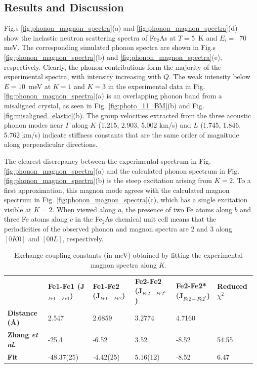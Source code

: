 \documentclass[10pt,doublespacing,edeposit]{uiucthesis2020}
\begin{document}
\begin{mainmatter}
\section{Results and Discussion}



Fig.s \ref{fig:phonon_magnon_spectra}(a) and \ref{fig:phonon_magnon_spectra}(d) show the inelastic neutron scattering spectra of Fe$_2$As at $T = 5$~K and $E_i =$~70 meV. The corresponding simulated phonon spectra are shown in Fig.s \ref{fig:phonon_magnon_spectra}(b) and \ref{fig:phonon_magnon_spectra}(e), respectively. Clearly, the phonon contributions form the majority of the experimental spectra, with intensity increasing with $Q$. 
The weak intensity below $E = 10$~meV  at $K = 1$ and $K = 3$ in the experimental data in Fig. \ref{fig:phonon_magnon_spectra}(a) is an overlapping phonon band from a misaligned crystal, as seen in Fig. \ref{fig:photo_11_BM}(b) and Fig. \ref{fig:misaligned_elastic}(b). The group velocities extracted from the three acoustic phonon modes near $\Gamma$ along $K$ (1.215, 2.903, 5.002 km/s) and $L$ (1.745, 1.846, 5.762 km/s) indicate stiffness constants that are the same order of magnitude along  perpendicular directions.




The clearest discrepancy between the experimental spectrum in Fig. \ref{fig:phonon_magnon_spectra}(a) and the calculated phonon spectrum in Fig. \ref{fig:phonon_magnon_spectra}(b) is the steep excitation arising from $K = 2$. To a first approximation, this magnon mode agrees with the calculated magnon spectrum in Fig. \ref{fig:phonon_magnon_spectra}(c), which has a single excitation visible at $K = 2$. When viewed along $a$, the presence of two Fe atoms along $b$ and three Fe atoms along $c$ in the Fe$_2$As chemical unit cell means that the periodicities of the observed phonon and magnon spectra are 2 and 3 along $[0K0]$ and $[00L]$, respectively.

\begin{table}
\caption{\label{tab:Jvalues} 
Exchange coupling constants (in meV) obtained by fitting the experimental magnon spectra along $K$. 
}
\centering
\begin{tabular}{p{3cm}p{2cm}p{2cm}p{2cm}p{2cm}p{2cm}}
\hline\hline
	&  \textbf{Fe1-Fe1 (J$_{Fe1-Fe1}$)} & \textbf{Fe1-Fe2 (J$_{Fe1-Fe2}$)} & \textbf{Fe2-Fe2 (J$_{Fe2-Fe2^a}$)} & \textbf{Fe2-Fe2* (J$_{Fe2-Fe2^b}$)} & \textbf{Reduced $\chi^2$} \\

\textbf{Distance (\AA)} & 2.547 & 2.6859 & 3.2774 & 4.7160\\
\hline\hline
\textbf{Zhang \emph{et al}.} & -25.4 & -6.52 & 3.52 & -8.52 & 54.55\\
\hline
\textbf{Fit} & -48.37(25) & -4.42(25) & 5.16(12) & -8.52 & 6.47\\
\hline\hline
\end{tabular}
~\\
\end{table}




\end{mainmatter}
\end{document}

